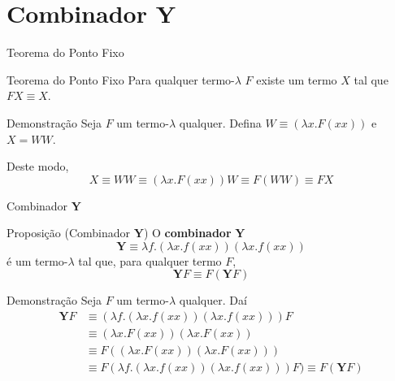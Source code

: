 \section{Combinador $\mathbf{Y}$}

\begin{frame}[fragile]{Teorema do Ponto Fixo}

    \begin{block}{Teorema do Ponto Fixo}
        Para qualquer termo-$\lambda$ $F$ existe um termo $X$ tal que $FX\equiv X$.
    \end{block}

    \vspace{0.2in}

    \begin{block}{Demonstração}
        Seja $F$ um termo-$\lambda$ qualquer. Defina $W\equiv (\lambda x.F(xx))$ e $X=WW$. 

        Deste modo,
        \[
            X\equiv WW \equiv (\lambda x.F(xx))W \equiv F(WW)\equiv FX
        \]
    \end{block}
\end{frame}

\begin{frame}[fragile]{Combinador $\mathbf{Y}$}

    \begin{block}{Proposição (Combinador $\mathbf{Y}$)}
    O \textbf{combinador} $\mathbf{Y}$
    \[
        \mathbf{Y}\equiv \lambda f.(\lambda x.f(xx))(\lambda x.f(xx))
    \]
    é um termo-$\lambda$ tal que, para qualquer termo $F$,
    \[
        \mathbf{Y}F\equiv F(\mathbf{Y}F)
    \]
    \end{block}

    \vspace{0.1in}

    \begin{block}{Demonstração}
        Seja $F$ um termo-$\lambda$ qualquer. Daí
        \begin{align*}
            \mathbf{Y}F &\equiv (\lambda f.(\lambda x.f(xx))(\lambda x.f(xx)))F \\
             &\equiv (\lambda x.F(xx))(\lambda x.F(xx)) \\
             &\equiv F((\lambda x.F(xx))(\lambda x.F(xx))) \\
             &\equiv F(\lambda f.(\lambda x.f(xx))(\lambda x.f(xx)))F) \equiv F(\mathbf{Y}F)
        \end{align*}
    \end{block}
\end{frame}

